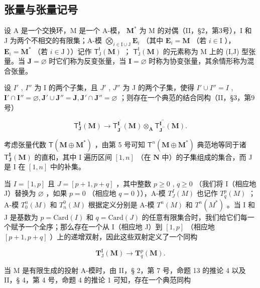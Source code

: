 \subsection{张量与张量记号}

设 A 是一个交换环，M 是一个 A-模， \(\mathbf{M}^*\) 为 M 的对偶（II，§2，第3号），I 和 J 为两个不相交的有限集；A-模 \(\bigotimes_{i\in \mathrm{I}\cup \mathrm{J}}\mathbf{E}_i\) （其中 \(\mathbf{E}_i = \mathbf{M}\) （若 \(i\in \mathrm{I}\) ）， \(\mathbf{E}_i = \mathbf{M}^*\) （若 \(i\in \mathrm{J}\) ））记作 \(\mathsf{T}_{\mathsf{J}}^{\mathsf{I}}(\mathbf{M})\) ； \(\mathsf{T}_{\mathsf{J}}^{\mathsf{I}}(\mathbf{M})\) 的元素称为 M 上的 (I,J) 型张量。当 \(\mathbf{J} = \varnothing\) 时它们称为反变张量，当 \(\mathbf{I} = \varnothing\) 时称为协变张量，其余情形称为混合张量。

设 \(I'\) , \(I''\) 为 I 的两个子集，且 \(J'\) , \(J''\) 为 J 的两个子集，使得 \(I' \cup I'' = I\) , \(\mathbf{I}' \cap \mathbf{I}'' = \varnothing, \mathbf{J}' \cup \mathbf{J}'' = \mathbf{J}, \mathbf{J}' \cap \mathbf{J}'' = \varnothing\) ；则存在一个典范的结合同构（II，§3，第9号）

\[
\mathsf {T} _ {\mathbf {J}} ^ {\mathbf {I}} (\mathbf {M}) \rightarrow \mathsf {T} _ {\mathbf {J} ^ {\prime}} ^ {\mathbf {I} ^ {\prime}} (\mathbf {M}) \otimes_ {\mathbf {A}} \mathsf {T} _ {\mathbf {J} ^ {\prime \prime}} ^ {\mathbf {I} ^ {\prime \prime}} (\mathbf {M}).\tag{11}
\]

考虑张量代数 \(\mathsf{T}(\mathbf{M}\oplus \mathbf{M}^{*})\) ，由第 5 号可知 \(\mathsf{T}^n (\mathbf{M}\oplus \mathbf{M}^*)\) 典范地等同于诸 \(\mathsf{T}_{\mathbf{J}}^{\mathbf{I}}(\mathbf{M})\) 的直和，其中 I 遍历区间 \([1,n]\) （在 \(\mathbf{N}\) 中）的子集组成的集合，而 J 是 I 在 \([1,n]\) 中的补集。

当 \(I = [1, p]\) 且 \(J = [p + 1, p + q]\) ，其中整数 \(p \geqslant 0\) , \(q \geqslant 0\) （我们将 I（相应地 J）替换为 \(\varnothing\) ，如果 \(p = 0\) （相应地 \(q = 0\) ）），A-模 \(T_J^I(M)\) 也记作 \(T_q^p(M)\) ；A-模 \(T_0^n(M)\) 和 \(T_n^0(M)\) 根据定义分别是 A-模 \(T^n(M)\) 和 \(T^n(M^*)\) 。当 I 和 J 是基数为 \(p = \text{Card}(I)\) 和 \(q = \text{Card}(J)\) 的任意有限集合时，我们给它们每一个赋予一个全序；那么存在一个从 I（相应地 J）到 \([1, p]\) （相应地 \([p + 1, p + q]\) ）上的递增双射，因此这些双射定义了一个同构

\[
\mathbf {T} _ {\mathrm{J}} ^ {\mathrm{I}} (\mathbf {M}) \rightarrow \mathbf {T} _ {q} ^ {p} (\mathbf {M}).
\]

当 M 是有限生成的投射 A-模时，由 II，§ 2，第 7 号，命题 13 的推论 4 以及 II，§ 4，第 4 号，命题 4 的推论 1 可知，存在一个典范同构

